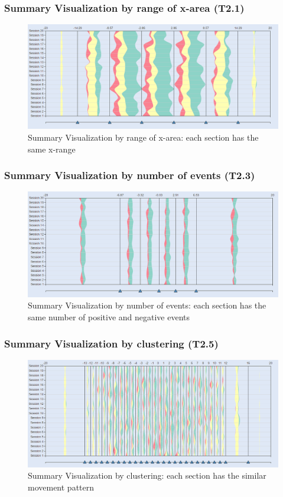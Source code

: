 \documentclass{beamer}
\begin{document}
\begin{frame}
\frametitle{Summary Visualization by range of x-area (T2.1)}
\begin{figure}
\includegraphics[scale=0.35]{images/summary_type1.png}
\caption{Summary Visualization by range of x-area: each section has the same x-range}
\end{figure}
\end{frame}
\begin{frame}
\frametitle{Summary Visualization by number of events (T2.3)}
\begin{figure}
\includegraphics[scale=0.35]{images/summary_type2.png}
\caption{Summary Visualization by number of events: each section has the same number of positive and negative events}
\end{figure}
\end{frame}
\begin{frame}
\frametitle{Summary Visualization by clustering (T2.5)}
\begin{figure}
\includegraphics[scale=0.35]{images/summary_clustered.png}
\caption{Summary Visualization by clustering: each section has the similar movement pattern}
\end{figure}
\end{frame}
\end{document}
